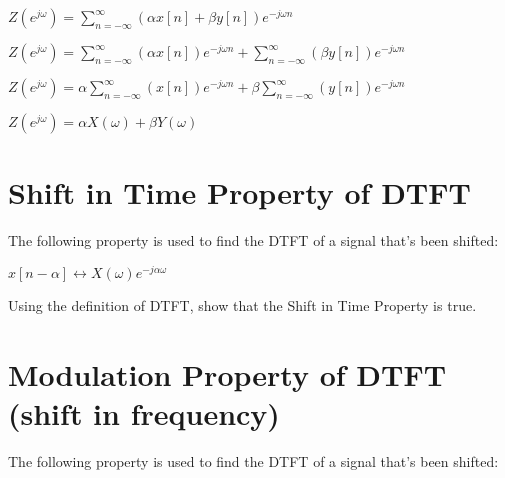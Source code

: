 \documentclass[11pt]{article}
\begin{document}
\begin{center}

$ 
Z(e^{j \omega}) = \sum_{n = -\infty}^{\infty} ( \alpha x[n] + \beta y[n])  e^{-j \omega n}
$
\end{center}

\newpage

\begin{center}

$ 
Z(e^{j \omega}) = \sum_{n = -\infty}^{\infty} ( \alpha x[n] )  e^{-j \omega n} + \sum_{n = -\infty}^{\infty} (  \beta y[n])  e^{-j \omega n}
$
\end{center}

\vspace{3mm}

\begin{center}

$ 
Z(e^{j \omega}) = \alpha \sum_{n = -\infty}^{\infty} (  x[n] )  e^{-j \omega n} + \beta \sum_{n = -\infty}^{\infty} (  y[n])  e^{-j \omega n}
$
\end{center}

\vspace{3mm}

\begin{center}

$ 
Z(e^{j \omega}) = \alpha X(\omega) + \beta Y(\omega)
$
\end{center}


\section{Shift in Time Property of DTFT}

The following property is used to find the DTFT of a signal that's been shifted: \newline

\begin{center}

$
x[n - \alpha]  \longleftrightarrow  X(\omega) e^{- j \alpha \omega}
$
\end{center}

\vspace{4mm}

Using the definition of DTFT, show that the Shift in Time Property is true. 


\section{Modulation Property of DTFT (shift in frequency)}

The following property is used to find the DTFT of a signal that's been shifted: \newline
\end{document}
